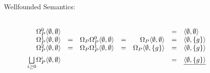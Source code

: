 \begin{Loesung}
\begin{UList}
\begin{description}
\item[Wellfounded Semantics:] ~\\
  \(
  \begin{array}{rcrcrcl}
    \Omega^0_P\langle \emptyset,\emptyset\rangle & & & & & = &
    \langle\emptyset,\emptyset\rangle \\
    \Omega^1_P\langle \emptyset,\emptyset\rangle & = & 
    \Omega_P\Omega^0_P\langle \emptyset,\emptyset\rangle & = &
    \Omega_P\langle \emptyset,\emptyset\rangle & = & 
    \langle\emptyset,\{g\}\rangle \\
    \Omega^2_P\langle \emptyset,\emptyset\rangle & = & 
    \Omega_P\Omega^1_P\langle \emptyset,\emptyset\rangle & = &
    \Omega_P\langle \emptyset,\{g\}\rangle & = & 
    \langle\emptyset,\{g\}\rangle \\[2mm]
    \underset{i\geq 0}{\bigsqcup}\Omega^i_P\langle \emptyset,\emptyset\rangle 
    & & & & & = & \underline{\langle\emptyset,\{g\}\rangle}
  \end{array}
  \)
%

\end{description}
\end{UList}
\end{Loesung}
